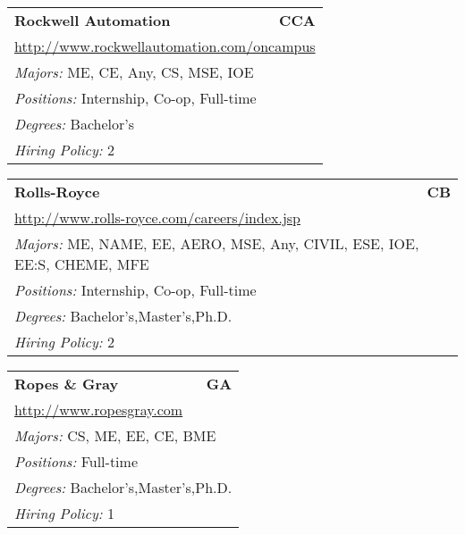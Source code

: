 \documentclass[twoside]{article}
\begin{document}
\begin{center}
\begin{multicols}{3}
\begin{FlushLeft}
\begin{minipage}{.9\columnwidth}
\end{minipage}
 
\begin{minipage}{.9\columnwidth}\begin{tabularx}{.95\columnwidth}{Xr}
                 {\Large\bf Rockwell Automation} & {\Large\bf CCA}\\
    \multicolumn{2}{p{.95\columnwidth}}{\url{http://www.rockwellautomation.com/oncampus}}\\
    \multicolumn{2}{p{.95\columnwidth}}{\emph{Majors:} ME, CE, Any, CS, MSE, IOE}\\
    \multicolumn{2}{p{.95\columnwidth}}{\emph{Positions:} Internship, Co-op, Full-time}\\
    \multicolumn{2}{p{.95\columnwidth}}{\emph{Degrees:} Bachelor's}\\
    \multicolumn{2}{p{.95\columnwidth}}{\emph{Hiring Policy:} 2}\\
    \end{tabularx}
    
\end{minipage}
 
\begin{minipage}{.9\columnwidth}\begin{tabularx}{.95\columnwidth}{Xr}
                 {\Large\bf Rolls-Royce} & {\Large\bf CB}\\
    \multicolumn{2}{p{.95\columnwidth}}{\url{http://www.rolls-royce.com/careers/index.jsp}}\\
    \multicolumn{2}{p{.95\columnwidth}}{\emph{Majors:} ME, NAME, EE, AERO, MSE, Any, CIVIL, ESE, IOE, EE:S, CHEME, MFE}\\
    \multicolumn{2}{p{.95\columnwidth}}{\emph{Positions:} Internship, Co-op, Full-time}\\
    \multicolumn{2}{p{.95\columnwidth}}{\emph{Degrees:} Bachelor's,Master's,Ph.D.}\\
    \multicolumn{2}{p{.95\columnwidth}}{\emph{Hiring Policy:} 2}\\
    \end{tabularx}
    
\end{minipage}
 
\begin{minipage}{.9\columnwidth}\begin{tabularx}{.95\columnwidth}{Xr}
                 {\Large\bf Ropes \& Gray} & {\Large\bf GA}\\
    \multicolumn{2}{p{.95\columnwidth}}{\url{http://www.ropesgray.com}}\\
    \multicolumn{2}{p{.95\columnwidth}}{\emph{Majors:} CS, ME, EE, CE, BME}\\
    \multicolumn{2}{p{.95\columnwidth}}{\emph{Positions:} Full-time}\\
    \multicolumn{2}{p{.95\columnwidth}}{\emph{Degrees:} Bachelor's,Master's,Ph.D.}\\
    \multicolumn{2}{p{.95\columnwidth}}{\emph{Hiring Policy:} 1}\\
    \end{tabularx}
    

\end{minipage}
\end{FlushLeft}
\end{multicols}
\end{center}
\end{document}
